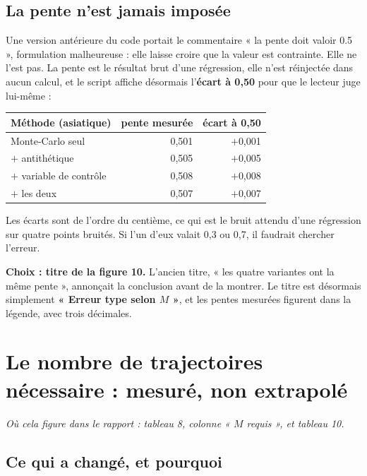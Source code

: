 \documentclass[11pt,a4paper]{article}
\newcommand{\ou}[1]{\textit{\small Où cela figure dans le rapport : #1}}
\begin{document}
\subsection{La pente n'est jamais imposée}

Une version antérieure du code portait le commentaire « la pente doit valoir
0.5 », formulation malheureuse : elle laisse croire que la valeur est
contrainte. Elle ne l'est pas. La pente est le résultat brut d'une régression,
elle n'est réinjectée dans aucun calcul, et le script affiche désormais
l'\textbf{écart à 0,50} pour que le lecteur juge lui-même :

\begin{center}
\small
\begin{tabular}{lrr}
\toprule
Méthode (asiatique) & pente mesurée & écart à 0,50 \\
\midrule
Monte-Carlo seul       & 0,501 & $+$0,001 \\
$+$ antithétique       & 0,505 & $+$0,005 \\
$+$ variable de contrôle & 0,508 & $+$0,008 \\
$+$ les deux           & 0,507 & $+$0,007 \\
\bottomrule
\end{tabular}
\end{center}

Les écarts sont de l'ordre du centième, ce qui est le bruit attendu d'une
régression sur quatre points bruités. Si l'un d'eux valait 0,3 ou 0,7, il
faudrait chercher l'erreur.

\begin{choix}
\textbf{Choix : titre de la figure 10.} L'ancien titre, « les quatre variantes
ont la même pente », annonçait la conclusion avant de la montrer. Le titre est
désormais simplement \textbf{« Erreur type selon $M$ »}, et les pentes mesurées
figurent dans la légende, avec trois décimales.
\end{choix}

\section{Le nombre de trajectoires nécessaire : mesuré, non extrapolé}

\ou{tableau 8, colonne « $M$ requis », et tableau 10.}

\subsection{Ce qui a changé, et pourquoi}
\end{document}
